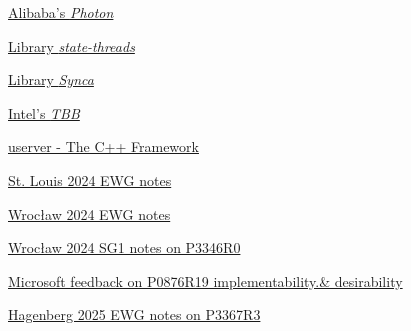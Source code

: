 \begin{thebibliography}{99}
        \href{https://github.com/alibaba/PhotonLibOS}
        {Alibaba's \emph{Photon}}

        \href{https://github.com/ossrs/state-threads}
        {Library \emph{state-threads}}

        \href{https://github.com/gridem/Synca}
        {Library \emph{Synca}}

        \href{https://github.com/intel/tbb}
        {Intel's \emph{TBB}}

        \href{https://github.com/userver-framework}
        {userver - The C++ Framework}

        \href{https://wiki.edg.com/bin/view/Wg21stlouis2024/NotesEWGP0876}
        {St. Louis 2024 EWG notes}

        \href{https://wiki.edg.com/bin/view/Wg21wroclaw2024/NotesEWGP0876}
        {Wrocław 2024 EWG notes}

        \href{https://wiki.edg.com/bin/edit/Wg21wroclaw2024/P3346R0?topicparent=Wg21wroclaw2024.SG1}
        {Wrocław 2024 SG1 notes on P3346R0}

        \href{https://lists.isocpp.org/ext/2025/02/25138.php}
        {Microsoft feedback on P0876R19 implementability.\& desirability}

        \href{https://wiki.edg.com/bin/edit/Wg21hagenberg2025/NotesEWGP3367}
        {Hagenberg 2025 EWG notes on P3367R3}

\end{thebibliography}
